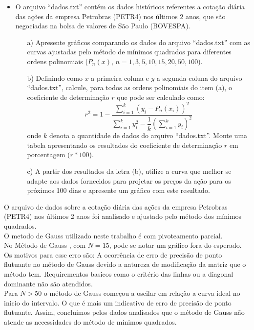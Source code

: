\documentclass{article}
\newcounter{execs}
\newcommand{\exec}[0]{\addtocounter{execs}{1}\item[\textbf{\arabic{execs}.}]}
\begin{document}
\thispagestyle{first}
%    

\begin{itemize}

\exec O arquivo ``dados.txt'' contém os dados históricos referentes a cotação diária das ações da empresa Petrobras (PETR4) nos últimos 2 anos, que são negociadas na bolsa de valores de São Paulo (BOVESPA). 

\begin{itemize}

\item[a)] Apresente gráficos comparando os dados do arquivo ``dados.txt'' com as curvas ajustadas pelo método de mínimos quadrados para diferentes ordens polinomiais ($P_n(x)$, $n=1,3,5,10,15,20,50,100$).

\item[b)] Definindo como $x$ a primeira coluna e $y$ a segunda coluna do arquivo ``dados.txt'', calcule, para todos as ordens polinomiais do item (a), o coeficiente de determinação $r$ que pode ser calculado como:
$$
r^2= 1 - \dfrac{\displaystyle \sum_{i=1}^{k} \left(y_i-P_n(x_i) \right)^2}{\displaystyle \sum_{i=1}^{k} y_i^2 - \dfrac{1}{k} \left(\sum_{i=1}^{k} y_i \right)^2 }
$$
onde $k$ denota a quantidade de dados do arquivo ``dados.txt''. Monte uma tabela apresentando os resultados do coeficiente de determinação $r$ em porcentagem ($r*100$).

\item[c)] A partir dos resultados da letra (b), utilize a curva que melhor se adapte aos dados fornecidos para projetar os preços da ação para os próximos 100 dias e apresente um gráfico com este resultado. 

\end{itemize}

\end{itemize}

\newpage

O arquivo de dados sobre a cotação diária das ações da empresa Petrobras (PETR4) nos últimos 2 anos foi analisado e ajustado pelo método dos mínimos quadrados.\\

\text O metodo de Gauss utilizado neste trabalho é com pivoteamento parcial.\\

\text No Método de Gauss , com $N = 15$, pode-se notar um gráfico fora do esperado. Os motivos para esse erro são: A ocorrência de erro de precisão de ponto flutuante no método de Gauss devido a natureza de modificação da matriz que o método tem. Requirementos basicos como o critério das linhas ou a diagonal dominante não são atendidos. \\
\text Para $N > 50$ o método de Gauss começou a oscilar em relação a curva ideal no inicio do intervalo. O que é mais um indicativo de erro de precisão de ponto flutuante.
\text Assim, concluimos pelos dados analisados que o método de Gauss não atende as necessidades do método de mínimos quadrados.
\end{document}
